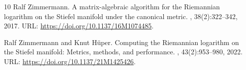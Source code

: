 \documentclass[10pt,twoside,dvipsnames]{siamart1116}
\numberwithin{algorithm}{section}
\numberwithin{equation}{section}
\begin{document}
\begin{thebibliography}{10}
Ralf Zimmermann.
\newblock A matrix-algebraic algorithm for the {R}iemannian logarithm on the
  {S}tiefel manifold under the canonical metric.
,
  38(2):322--342, 2017.
\newblock URL: \url{https://doi.org/10.1137/16M1074485}.

Ralf Zimmermann and Knut H\"{u}per.
\newblock Computing the {R}iemannian logarithm on the {S}tiefel manifold:
  Metrics, methods, and performance.
,
  43(2):953--980, 2022.
\newblock URL: \url{https://doi.org/10.1137/21M1425426}.

\end{thebibliography}
\end{document}
